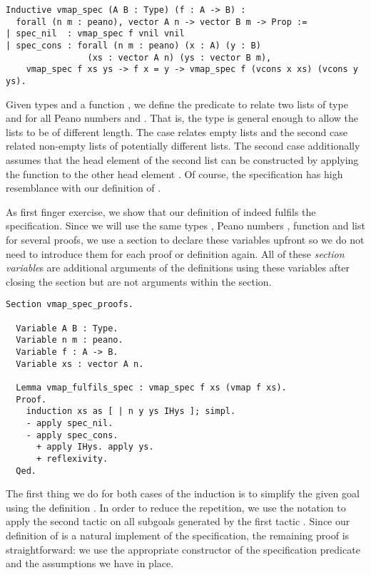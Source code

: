 \begin{verbatim}
Inductive vmap_spec (A B : Type) (f : A -> B) :
  forall (n m : peano), vector A n -> vector B m -> Prop :=
| spec_nil  : vmap_spec f vnil vnil
| spec_cons : forall (n m : peano) (x : A) (y : B)
                (xs : vector A n) (ys : vector B m),
    vmap_spec f xs ys -> f x = y -> vmap_spec f (vcons x xs) (vcons y ys).
\end{verbatim}

Given types  and a function , we define the predicate to relate two lists of type  and  for all Peano numbers  and .
That is, the type is general enough to allow the lists to be of different length.
The  case relates empty lists and the second case  related non-empty lists of potentially different lists.
The second case additionally assumes that the head element of the second list  can be constructed by applying the function to the other head element .
Of course, the specification has high resemblance with our definition of .

As first finger exercise, we show that our definition of  indeed fulfils the specification.
Since we will use the same types , Peano numbers , function  and list  for several proofs, we use a section to declare these variables upfront so we do not need to introduce them for each proof or definition again.
All of these \emph{section variable}s are additional arguments of the definitions using these variables after closing the section but are not arguments within the section.

\begin{verbatim}
Section vmap_spec_proofs.

  Variable A B : Type.
  Variable n m : peano.
  Variable f : A -> B.
  Variable xs : vector A n.

  Lemma vmap_fulfils_spec : vmap_spec f xs (vmap f xs).
  Proof.
    induction xs as [ | n y ys IHys ]; simpl.
    - apply spec_nil.
    - apply spec_cons.
      + apply IHys. apply ys.
      + reflexivity.
  Qed.
\end{verbatim}

The first thing we do for both cases of the induction is to simplify the given goal using the definition .
In order to reduce the repetition, we use the notation  to apply the second tactic  on all subgoals generated by the first tactic .
Since our definition of  is a natural implement of the specification, the remaining proof is straightforward: we use the appropriate constructor of the specification predicate and the assumptions we have in place.

